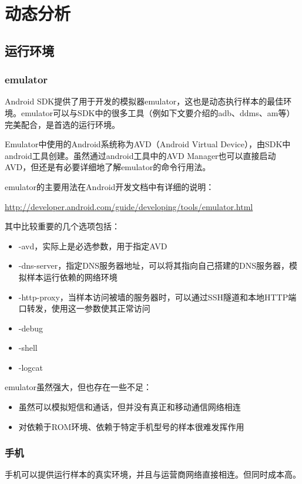 \chapter{动态分析}

\section{运行环境}
\subsection{emulator}
Android SDK提供了用于开发的模拟器emulator，这也是动态执行样本的最佳环境。emulator可以与SDK中的很多工具（例如下文要介绍的adb、ddms、am等）完美配合，是首选的运行环境。

Emulator中使用的Android系统称为AVD（Android Virtual Device），由SDK中android工具创建。虽然通过android工具中的AVD Manager也可以直接启动AVD，但还是有必要详细地了解emulator的命令行用法。

emulator的主要用法在Android开发文档中有详细的说明：

\href{http://developer.android.com/guide/developing/tools/emulator.html}{http://developer.android.com/guide/developing/tools/emulator.html}

其中比较重要的几个选项包括：

\begin{itemize}
\item -avd，实际上是必选参数，用于指定AVD
\item -dns-server，指定DNS服务器地址，可以将其指向自己搭建的DNS服务器，模拟样本运行依赖的网络环境
\item -http-proxy，当样本访问被墙的服务器时，可以通过SSH隧道和本地HTTP端口转发，使用这一参数使其正常访问
\item -debug
\item -shell
\item -logcat
\end{itemize}

emulator虽然强大，但也存在一些不足：

\begin{itemize}
\item 虽然可以模拟短信和通话，但并没有真正和移动通信网络相连
\item 对依赖于ROM环境、依赖于特定手机型号的样本很难发挥作用
\end{itemize}

\subsection{手机}
手机可以提供运行样本的真实环境，并且与运营商网络直接相连。但同时成本高。

